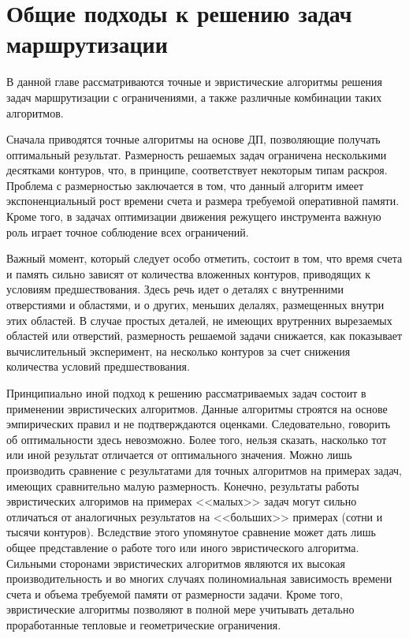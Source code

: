 
\section{
  Общие подходы
  к решению задач маршрутизации
}
\label{sect:5.1}

В данной главе рассматриваются точные и эвристические алгоритмы решения задач
маршрутизации с ограничениями,
а также различные комбинации таких алгоритмов.

Сначала приводятся точные алгоритмы на основе ДП,
позволяющие получать оптимальный результат.
Размерность решаемых задач ограничена несколькими десятками контуров,
что, в принципе, соответствует некоторым типам раскроя.
Проблема с размерностью заключается в том,
что данный алгоритм имеет экспоненциальный рост времени счета
и размера требуемой оперативной памяти.
Кроме того, в задачах оптимизации движения режущего инструмента важную роль
играет точное соблюдение всех ограничений.

Важный момент, который следует особо отметить, состоит в том,
что время счета и память сильно зависят от количества вложенных контуров,
приводящих к условиям предшествования.
Здесь речь идет о деталях с внутренними отверстиями
и областями, и о других, меньших делалях, размещенных внутри этих областей.
В случае простых деталей, не имеющих врутренних вырезаемых областей или отверстий,
размерность решаемой задачи снижается,
как показывает вычислительный эксперимент,
на несколько контуров за счет снижения количества условий предшествования.

Принципиально иной подход к решению рассматриваемых задач состоит в применении
эвристических алгоритмов.
Данные алгоритмы строятся на основе эмпирических правил и не подтверждаются оценками.
Следовательно, говорить об оптимальности здесь невозможно.
Более того, нельзя сказать,
насколько тот или иной результат отличается от оптимального значения.
Можно лишь производить сравнение с результатами
для точных алгоритмов на примерах задач, имеющих сравнительно малую размерность.
Конечно, результаты работы эвристических алгоримов на примерах <<малых>>
задач могут сильно отличаться от аналогичных результатов на <<больших>> примерах
(сотни и тысячи контуров).
Вследствие этого упомянутое сравнение может дать лишь
общее представление о работе того или иного эвристического алгоритма.
Сильными сторонами эвристических алгоритмов являются их высокая производительность
и во многих случаях полиномиальная зависимость времени счета и объема
требуемой памяти от размерности задачи.
Кроме того, эвристические алгоритмы позволяют в полной мере учитывать
детально проработанные тепловые и геометрические ограничения.

